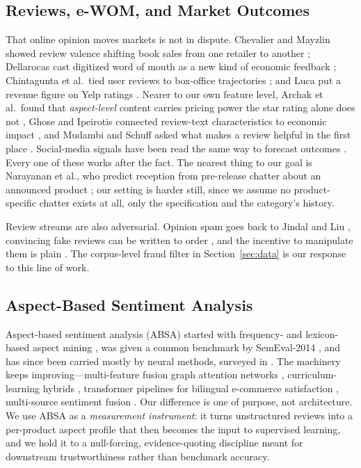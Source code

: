 \documentclass[journal]{IEEEtran}
\begin{document}
\subsection{Reviews, e-WOM, and Market Outcomes}
That online opinion moves markets is not in dispute. Chevalier and Mayzlin showed review valence shifting book sales from one retailer to another \cite{chevalier2006wom}; Dellarocas cast digitized word of mouth as a new kind of economic feedback \cite{dellarocas2003digitization}; Chintagunta et al.\ tied user reviews to box-office trajectories \cite{chintagunta2010effects}; and Luca put a revenue figure on Yelp ratings \cite{luca2016reviews}. Nearer to our own feature level, Archak et al.\ found that \emph{aspect-level} content carries pricing power the star rating alone does not \cite{archak2011deriving}, Ghose and Ipeirotis connected review-text characteristics to economic impact \cite{ghose2011estimating}, and Mudambi and Schuff asked what makes a review helpful in the first place \cite{mudambi2010helpful}. Social-media signals have been read the same way to forecast outcomes \cite{asur2010predicting}. Every one of these works after the fact. The nearest thing to our goal is Narayanan et al., who predict reception from pre-release chatter about an announced product \cite{narayanan2020prelaunch}; our setting is harder still, since we assume no product-specific chatter exists at all, only the specification and the category's history.

Review streams are also adversarial. Opinion spam goes back to Jindal and Liu \cite{jindal2008opinion}, convincing fake reviews can be written to order \cite{ott2011deceptive}, and the incentive to manipulate them is plain \cite{mayzlin2014promotional}. The corpus-level fraud filter in Section~\ref{sec:data} is our response to this line of work.

\subsection{Aspect-Based Sentiment Analysis}
Aspect-based sentiment analysis (ABSA) started with frequency- and lexicon-based aspect mining \cite{hu2004mining,liu2012sentiment}, was given a common benchmark by SemEval-2014 \cite{pontiki2014semeval}, and has since been carried mostly by neural methods, surveyed in \cite{zhang2022survey}. The machinery keeps improving---multi-feature fusion graph attention networks \cite{wang2025multifeature}, curriculum-learning hybrids \cite{lange2025curriculum}, transformer pipelines for bilingual e-commerce satisfaction \cite{shan2025bilingual}, multi-source sentiment fusion \cite{sesr2025multisource}. Our difference is one of purpose, not architecture. We use ABSA as a \emph{measurement instrument}: it turns unstructured reviews into a per-product aspect profile that then becomes the input to supervised learning, and we hold it to a null-forcing, evidence-quoting discipline meant for downstream trustworthiness rather than benchmark accuracy.
\end{document}

